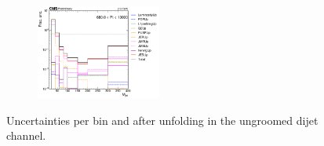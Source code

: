 \begin{figure}[ht!]
\begin{subfigure}
\end{subfigure}
  \begin{subfigure}
    \centering
    \includegraphics[width=0.45\textwidth]{figures/multijet/unfolding/dijet/unfolded_fracUnc_ungroomed_4.pdf}
\end{subfigure}
  \caption{Uncertainties per bin and after unfolding in the ungroomed dijet channel.}
  \label{fig:dijetunc_ungroomed_postunfold}
\end{figure}
